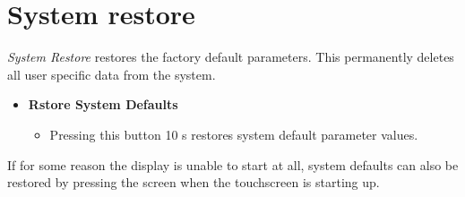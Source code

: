 \documentclass[12pt,a4paper,english]{uvmanual}
\begin{document}
\section{System restore}\label{ch:system_restore}

\textit{System Restore} restores the factory default parameters. This permanently deletes all user specific data from the system.


\begin{itemize}
 \item \textbf{Rstore System Defaults}
 \begin{itemize}
  \item Pressing this button 10 s restores system default parameter values.
 \end{itemize}
\end{itemize}

If for some reason the display is unable to start at all, system defaults can also be restored by pressing the screen when the touchscreen is starting up.
\end{document}
